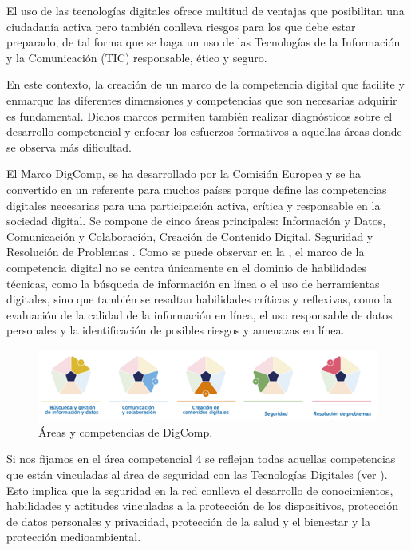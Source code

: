 \documentclass[spanish]{textolivre}
\begin{document}
El uso de las tecnologías digitales ofrece multitud de ventajas que posibilitan una ciudadanía activa pero también conlleva riesgos para los que debe estar preparado, de tal forma que se haga un uso de las Tecnologías de la Información y la Comunicación (TIC) responsable, ético y seguro.

En este contexto, la creación de un marco de la competencia digital que facilite y enmarque las diferentes dimensiones y competencias que son necesarias adquirir es fundamental. Dichos marcos permiten también realizar diagnósticos sobre el desarrollo competencial y enfocar los esfuerzos formativos a aquellas áreas donde se observa más dificultad.

El Marco DigComp, se ha desarrollado por la Comisión Europea y se ha convertido en un referente para muchos países porque define las competencias digitales necesarias para una participación activa, crítica y responsable en la sociedad digital. Se compone de cinco áreas principales: Información y Datos, Comunicación y Colaboración, Creación de Contenido Digital, Seguridad y Resolución de Problemas \cite{cabero2023nativos}. Como se puede observar en la , el marco de la competencia digital no se centra únicamente en el dominio de habilidades técnicas, como la búsqueda de información en línea o el uso de herramientas digitales, sino que también se resaltan habilidades críticas y reflexivas, como la evaluación de la calidad de la información en línea, el uso responsable de datos personales y la identificación de posibles riesgos y amenazas en línea.

\begin{figure}[h!]
\centering
\begin{minipage}{\textwidth}
\includegraphics[width=\textwidth]{Fig1.png}
\caption{Áreas y competencias de DigComp.}
\label{fig1}
\end{minipage}
\end{figure}

Si nos fijamos en el área competencial 4 se reflejan todas aquellas competencias que están vinculadas al área de seguridad con las Tecnologías Digitales (ver ). Esto implica que la seguridad en la red conlleva el desarrollo de conocimientos, habilidades y actitudes vinculadas a la protección de los dispositivos, protección de datos personales y privacidad, protección de la salud y el bienestar y la protección medioambiental.
\end{document}
